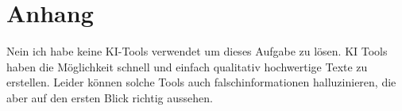 \chapter{Anhang}\label{ch:data}

Nein ich habe keine KI-Tools verwendet um dieses Aufgabe zu lösen.
KI Tools haben die Möglichkeit schnell und einfach qualitativ hochwertige Texte zu erstellen. Leider können solche Tools auch falschinformationen halluzinieren, die aber auf den ersten Blick richtig aussehen. 

